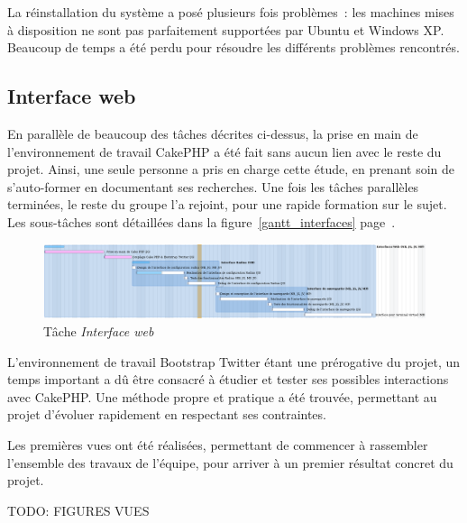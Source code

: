 La réinstallation du système a posé plusieurs fois problèmes~: les machines mises à disposition ne sont pas parfaitement supportées par Ubuntu et Windows XP. Beaucoup de temps a été perdu pour résoudre les différents problèmes rencontrés.

\subsection{Interface web}

En parallèle de beaucoup des tâches décrites ci-dessus, la prise en main de l'environnement de travail CakePHP a été fait sans aucun lien avec le reste du projet. Ainsi, une seule personne a pris en charge cette étude, en prenant soin de s'auto-former en documentant ses recherches. Une fois les tâches parallèles terminées, le reste du groupe l'a rejoint, pour une rapide formation sur le sujet. Les sous-tâches sont détaillées dans la figure~\ref{gantt_interfaces} page~\pageref{gantt_interface}.

\begin{figure}[!h]
	\label{gantt_interface}
	\begin{center}
		\includegraphics[width=\textwidth]{img/gantt_interface.png}
	\end{center}
	\caption{Tâche \textit{Interface web}}
\end{figure}

L'environnement de travail Bootstrap Twitter étant une prérogative du projet, un temps important a dû être consacré à étudier et tester ses possibles interactions avec CakePHP. Une méthode propre et pratique a été trouvée, permettant au projet d'évoluer rapidement en respectant ses contraintes.

Les premières vues ont été réalisées, permettant de commencer à rassembler l'ensemble des travaux de l'équipe, pour arriver à un premier résultat concret du projet.

TODO: FIGURES VUES


